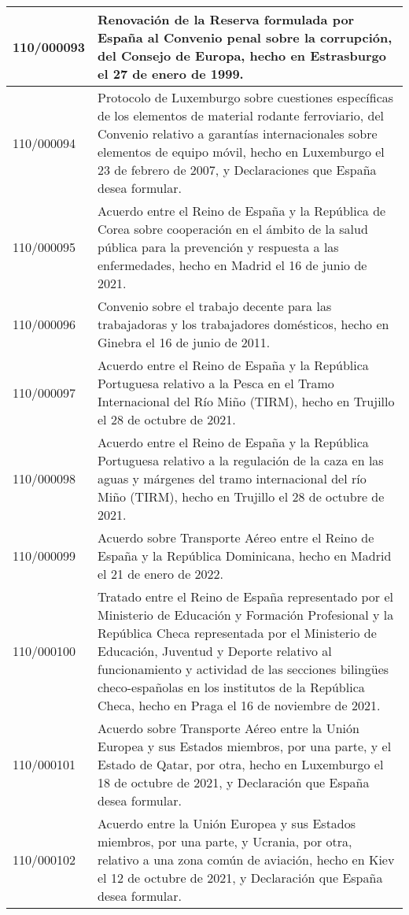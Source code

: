 {\begin{table}[H]
\begin{center}
\begin{tabularx}{\linewidth}{| l | X |}
\hline
110/000093 & Renovación de la Reserva formulada por España al Convenio penal sobre la corrupción, del Consejo de Europa, hecho en Estrasburgo el 27 de enero de 1999. \\
\hline
110/000094 & Protocolo de Luxemburgo sobre cuestiones específicas de los elementos de material rodante ferroviario, del Convenio relativo a garantías internacionales sobre elementos de equipo móvil, hecho en Luxemburgo el 23 de febrero de 2007, y Declaraciones que España desea formular. \\
\hline
110/000095 & Acuerdo entre el Reino de España y la República de Corea sobre cooperación en el ámbito de la salud pública para la prevención y respuesta a las enfermedades, hecho en Madrid el 16 de junio de 2021. \\
\hline
110/000096 & Convenio sobre el trabajo decente para las trabajadoras y los trabajadores domésticos, hecho en Ginebra el 16 de junio de 2011. \\
\hline
110/000097 & Acuerdo entre el Reino de España y la República Portuguesa relativo a la Pesca en el Tramo Internacional del Río Miño (TIRM), hecho en Trujillo el 28 de octubre de 2021. \\
\hline
110/000098 & Acuerdo entre el Reino de España y la República Portuguesa relativo a la regulación de la caza en las aguas y márgenes del tramo internacional del río Miño (TIRM), hecho en Trujillo el 28 de octubre de 2021. \\
\hline
110/000099 & Acuerdo sobre Transporte Aéreo entre el Reino de España y la República Dominicana, hecho en Madrid el 21 de enero de 2022. \\
\hline
110/000100 & Tratado entre el Reino de España representado por el Ministerio de Educación y Formación Profesional y la República Checa representada por el Ministerio de Educación, Juventud y Deporte relativo al funcionamiento y actividad de las secciones bilingües checo-españolas en los institutos de la República Checa, hecho en Praga el 16 de noviembre de 2021. \\
\hline
110/000101 & Acuerdo sobre Transporte Aéreo entre la Unión Europea y sus Estados miembros, por una parte, y el Estado de Qatar, por otra, hecho en Luxemburgo el 18 de octubre de 2021, y Declaración que España desea formular. \\
\hline
110/000102 & Acuerdo entre la Unión Europea y sus Estados miembros, por una parte, y Ucrania, por otra, relativo a una zona común de aviación, hecho en Kiev el 12 de octubre de 2021, y Declaración que España desea formular. \\

\end{tabularx}
\end{center}
\end{table}}

